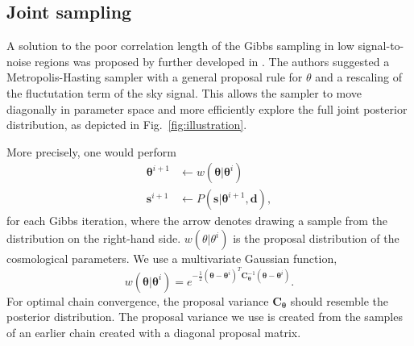 \documentclass[twocolumn]{../common/aa}
\begin{document}
\subsection{Joint sampling}
\label{sec:joint-sampling}
A solution to the poor correlation length of the Gibbs sampling in low signal-to-noise regions was proposed by \cite{jewell:2009} further developed in \cite{racine:2016}. The authors suggested a Metropolis-Hasting sampler with a general proposal rule for $\theta$ and a rescaling of the fluctutation term of the sky signal. This allows the sampler to move diagonally in parameter space and more efficiently explore the full joint posterior distribution, as depicted in Fig.~\ref{fig:illustration}.

More precisely, one would perform
\begin{align}
    \boldsymbol{\theta}^{i+1} 
 &\leftarrow w(\boldsymbol{\theta} |\boldsymbol{\theta}^i)\\
 \boldsymbol{s}^{i+1} &\leftarrow P(\boldsymbol{s} | \boldsymbol{\theta}^{i+1}, \boldsymbol{d}),
\end{align}
for each Gibbs iteration, where the arrow denotes drawing a sample from the distribution on the right-hand side. $w(\theta |\theta^i)$ is the proposal distribution of the cosmological parameters. We use a multivariate Gaussian function,
\begin{equation}
w(\boldsymbol{\theta} |\boldsymbol{\theta}^i) = e^{-\frac12 \left(\boldsymbol{\theta} - \boldsymbol{\theta}^i \right)^T \boldsymbol{C}_{\boldsymbol{\theta}}^{-1}\left(\boldsymbol{\theta} - \boldsymbol{\theta}^i \right)}.
\end{equation}
For optimal chain convergence, the proposal variance $\boldsymbol{C}_{\boldsymbol{\theta}}$ should resemble the posterior distribution. The proposal variance we use is created from the samples of an earlier chain created with a diagonal proposal matrix.
\end{document}
